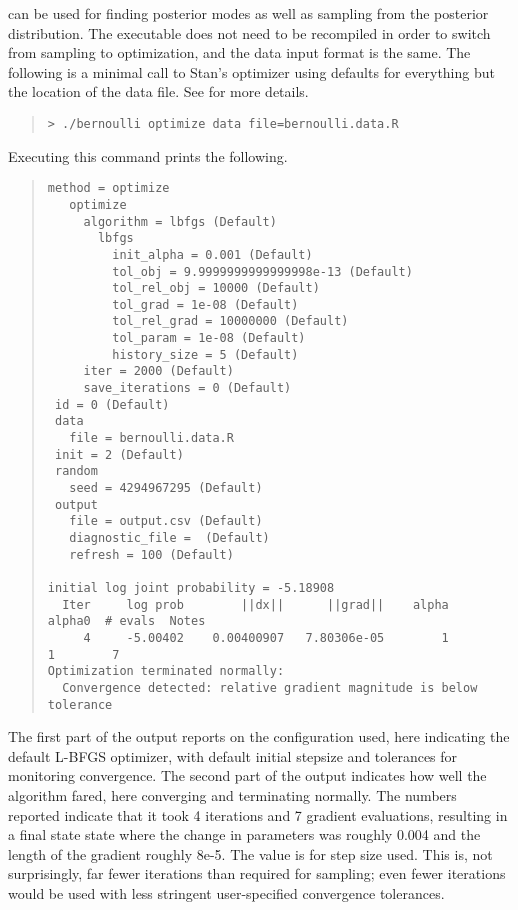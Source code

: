 \CmdStan can be used for finding posterior modes as well as sampling
from the posterior distribution. The executable does not need to be
recompiled in order to switch from sampling to optimization, and the
data input format is the same. The following is a minimal call to
Stan's optimizer using defaults for everything but the location of the
data file. See  for more
details.
%
\begin{quote}
\begin{Verbatim}[fontshape=sl]
> ./bernoulli optimize data file=bernoulli.data.R
\end{Verbatim}
\end{quote}
%
Executing this command prints the following.
%
\begin{quote}
\begin{Verbatim}[fontsize=\footnotesize]
 method = optimize
   optimize
     algorithm = lbfgs (Default)
       lbfgs
         init_alpha = 0.001 (Default)
         tol_obj = 9.9999999999999998e-13 (Default)
         tol_rel_obj = 10000 (Default)
         tol_grad = 1e-08 (Default)
         tol_rel_grad = 10000000 (Default)
         tol_param = 1e-08 (Default)
         history_size = 5 (Default)
     iter = 2000 (Default)
     save_iterations = 0 (Default)
 id = 0 (Default)
 data
   file = bernoulli.data.R
 init = 2 (Default)
 random
   seed = 4294967295 (Default)
 output
   file = output.csv (Default)
   diagnostic_file =  (Default)
   refresh = 100 (Default)

initial log joint probability = -5.18908
  Iter     log prob        ||dx||      ||grad||    alpha   alpha0  # evals  Notes
     4     -5.00402    0.00400907   7.80306e-05        1        1        7
Optimization terminated normally:
  Convergence detected: relative gradient magnitude is below tolerance
\end{Verbatim}
\end{quote}
%
The first part of the output reports on the configuration used, here
indicating the default L-BFGS optimizer, with default initial stepsize
and tolerances for monitoring convergence.  The second part of the
output indicates how well the algorithm fared, here converging and
terminating normally.  The numbers reported indicate that it took 4
iterations and 7 gradient evaluations, resulting in a final state
state where the change in parameters was roughly 0.004 and the length
of the gradient roughly 8e-5.  The  value is for step
size used.  This is, not surprisingly, far fewer iterations than
required for sampling; even fewer iterations would be used with less
stringent user-specified convergence tolerances.


